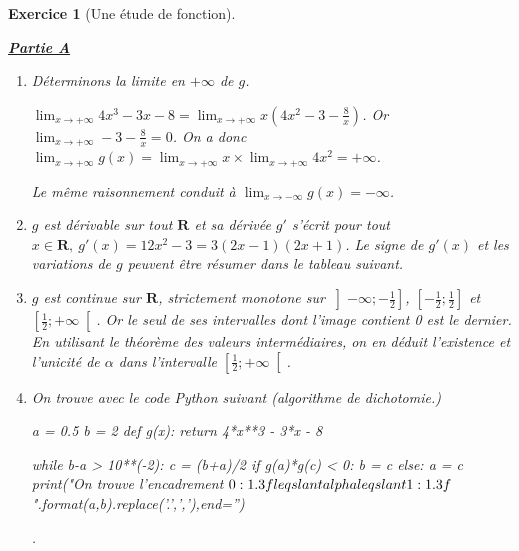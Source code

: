 \documentclass[12pt,a4paper]{article}
\theoremstyle{break}
\theoremstyle{nobreak}
\newtheorem{exercice}{Exercice}
\theoremstyle{nonumberplain}
\newcommand{\R}{\mathbf{R}}
\begin{document}
\begin{exercice}[Une étude de fonction]~

  \noindent\textbf{\underline{Partie A}}

  \begin{enumerate}
    \item Déterminons la limite en $+\infty$ de $g$.

      $\lim_{x\to+\infty} 4x^3 - 3x -8 = \lim_{x\to+\infty} x(4x^2 - 3 -
      \frac8x)$. Or $\lim_{x\to+\infty} - 3 - \frac8x = 0$. On a donc
      $\lim_{x\to+\infty} g(x) = \lim_{x\to+\infty} x \times
      \lim_{x\to+\infty} 4x^2 = +\infty$.

      Le même raisonnement conduit à $\lim_{x\to-\infty} g(x) = -\infty$.
    \item $g$ est dérivable sur tout $\R$ et sa dérivée $g'$ s'écrit
      pour tout $x\in\R,\ g'(x) = 12x^2 - 3 = 3(2x -1 )(2x+1)$. Le signe
      de $g'(x)$ et les variations de $g$ peuvent être résumer dans le
      tableau suivant.

      \begin{center}
      \end{center}

    \item $g$ est continue sur $\R$, strictement monotone sur
      $\left]-\infty;-\frac12\right]$, $\left[-\frac12;\frac12\right]$
      et $\left[\frac12;+\infty\right[$. Or le seul de ses intervalles
      dont l'image contient 0 est le dernier. En utilisant le théorème
      des valeurs intermédiaires, on en déduit l'existence et l'unicité
      de $\alpha$ dans l'intervalle $\left[\frac12;+\infty\right[$.
    \item On trouve avec le code Python suivant (algorithme de
      dichotomie.)
      \begin{pyblock}
        a = 0.5
        b = 2
        def g(x):
            return 4*x**3 - 3*x - 8

        while b-a > 10**(-2):
            c = (b+a)/2
            if g(a)*g(c) < 0:
                b = c
            else:
                a = c
        print("On trouve l'encadrement ${0:1.3f} \\leqslant \\alpha \
        \\leqslant {1:1.3f}$".format(a,b).replace('.',','),end='')
      \end{pyblock}
      \printpythontex\!.


\end{enumerate}
\end{exercice}
\end{document}
